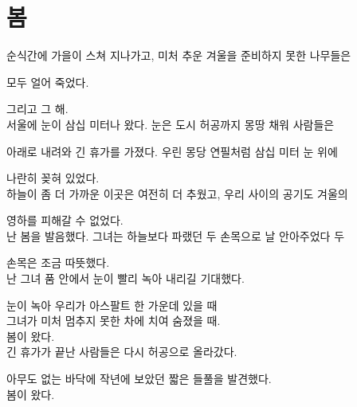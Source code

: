 \hypertarget{uxbd04}{%

\section{봄}\label{uxbd04}}



순식간에 가을이 스쳐 지나가고, 미처 추운 겨울을 준비하지 못한 나무들은

모두 얼어 죽었다.



그리고 그 해.\\

서울에 눈이 삼십 미터나 왔다. 눈은 도시 허공까지 몽땅 채워 사람들은

아래로 내려와 긴 휴가를 가졌다. 우린 몽당 연필처럼 삼십 미터 눈 위에

나란히 꽂혀 있었다.\\

하늘이 좀 더 가까운 이곳은 여전히 더 추웠고, 우리 사이의 공기도 겨울의

영하를 피해갈 수 없었다.\\

난 봄을 발음했다. 그녀는 하늘보다 파랬던 두 손목으로 날 안아주었다 두

손목은 조금 따뜻했다.\\

난 그녀 품 안에서 눈이 빨리 녹아 내리길 기대했다.



눈이 녹아 우리가 아스팔트 한 가운데 있을 때\\

그녀가 미처 멈추지 못한 차에 치여 숨졌을 때.\\

봄이 왔다.\\

긴 휴가가 끝난 사람들은 다시 허공으로 올라갔다.



아무도 없는 바닥에 작년에 보았던 짧은 들풀을 발견했다.\\

봄이 왔다.

